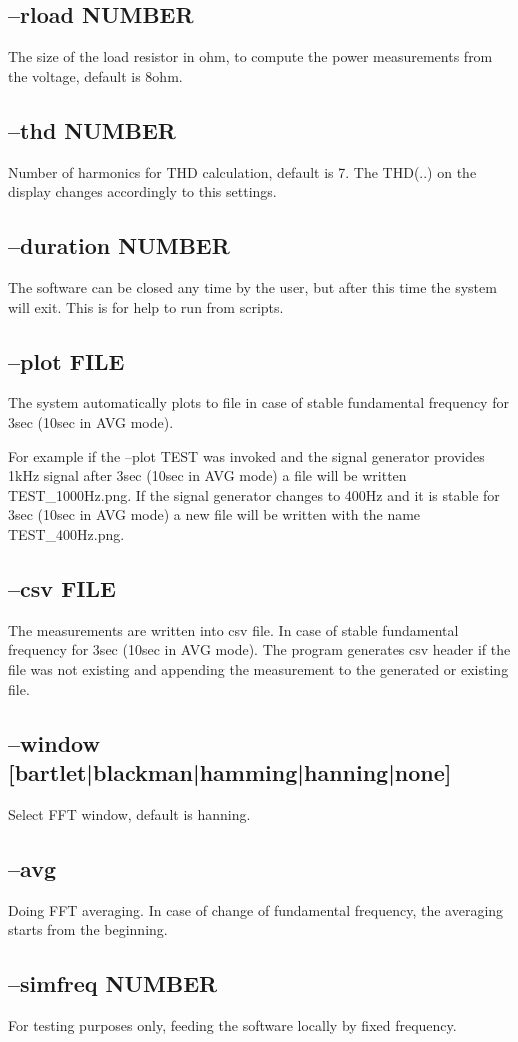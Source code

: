 \documentclass[10pt,a4paper]{article}
\begin{document}
\subsection{--rload NUMBER} 
The size of the load resistor in ohm, to compute the power measurements from the voltage, default is 8ohm.
\subsection{--thd NUMBER}
Number of harmonics for THD calculation, default is 7. The THD(..) on the display changes accordingly to this settings.
\subsection{--duration NUMBER}
The software can be closed any time by the user, but after this time the system will exit. This is for help to run from scripts.
\subsection{--plot FILE}
The system automatically plots to file in case of stable fundamental frequency for 3sec (10sec in AVG mode). 

For example if the --plot TEST was invoked and the signal generator provides 1kHz signal after 3sec (10sec in AVG mode) a file will be written TEST\_1000Hz.png. If the signal generator changes to 400Hz and it is stable for 3sec (10sec in AVG mode) a new file will be written with the name TEST\_400Hz.png.
\subsection{--csv FILE}
The measurements are written into csv file. In case of stable fundamental frequency for 3sec (10sec in AVG mode). The program generates csv header if the file was not existing and appending the measurement to the generated or existing file.
\subsection{--window [bartlet|blackman|hamming|hanning|none]}
Select FFT window, default is hanning.
\subsection{--avg}
Doing FFT averaging. In case of change of fundamental frequency, the averaging starts from the beginning.
\subsection{--simfreq NUMBER}
For testing purposes only, feeding the software locally by fixed frequency.
\end{document}
